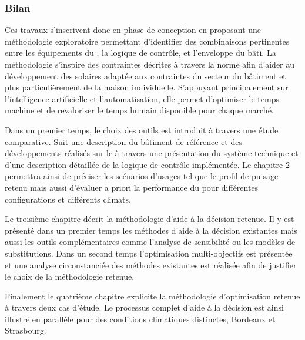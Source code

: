 \subsubsection{Bilan} %
\label{ssub:bilan_methode}

Ces travaux s’inscrivent donc en phase de conception en proposant une méthodologie
exploratoire permettant d’identifier des combinaisons pertinentes entre les équipements du
, la logique de contrôle, et l’enveloppe du bâti. La méthodologie s’inspire des
contraintes décrites à travers la norme  afin d’aider au développement
des  solaires adaptée aux contraintes du secteur du bâtiment et plus
particulièrement de la maison individuelle. S’appuyant principalement sur
l’intelligence artificielle et l’automatisation, elle permet d’optimiser le temps machine
et de revaloriser le temps humain disponible pour chaque marché.

Dans un premier temps, le choix des outils est introduit à travers une étude comparative.
Suit une description du bâtiment de référence et des développements réalisés sur le
 à travers une présentation du système technique et d’une description détaillée
de la logique de contrôle implémentée. Le chapitre $2$ permettra ainsi de préciser
les scénarios d’usages tel que le profil de puisage retenu mais aussi d’évaluer
a priori la performance du  pour différentes configurations et différents climats.

Le troisième chapitre décrit la méthodologie d’aide à la décision retenue. Il y est
présenté dans un premier temps les méthodes d’aide à la décision existantes mais
aussi les outils complémentaires comme l’analyse de sensibilité ou les modèles
de substitutions. Dans un second temps l’optimisation multi-objectifs est présentée
et une analyse circonstanciée des méthodes existantes est réalisée afin de justifier
le choix de la méthodologie retenue.

Finalement le quatrième chapitre explicite la méthodologie d’optimisation retenue à
travers deux cas d’étude. Le processus complet d’aide à la décision est ainsi illustré
en parallèle pour des conditions climatiques distinctes, Bordeaux et Strasbourg.

